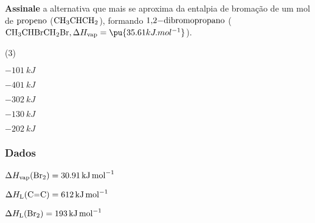 \documentclass[braun, twocolumn]{braun}
\begin{document}
\begin{problem}
[2A19]\textbf{Assinale} a alternativa que mais se aproxima da entalpia de
bromação de um mol de \(\ce{propeno}\) (\(\ce{CH3CHCH2}\)), formando
\(\ce{1,2-dibromopropano}\)
(\(\ce{CH3CHBrCH2Br}, \Delta H_\text{vap} = \pu{35.61 kJ.mol^{-1}}\)).


\begin{choices}
(3)
\item \(\qty{-101}{kJ}\)

\item \(\qty{-401}{kJ}\)

\item \(\qty{-302}{kJ}\)

\item \(\qty{-130}{kJ}\)

\item \(\qty{-202}{kJ}\)

\end{choices}
\subsubsection*{Dados}


\begin{datalist}

\item $\Delta H_\text{vap}(\ce{Br2}) = \qty{30,91}{kJ.mol^{-1}}$
\item $\Delta H_\text{L}(\ce{C=C}) = \qty{612}{kJ.mol^{-1}}$
\item $\Delta H_\text{L}(\ce{Br2}) = \qty{193}{kJ.mol^{-1}}$
\end{datalist}

\end{problem}
\end{document}

